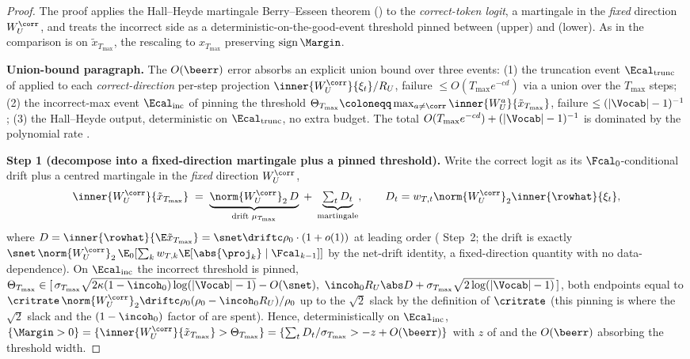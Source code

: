 \begin{proof}
The proof applies the Hall--Heyde martingale Berry--Esseen theorem
() to the \emph{correct-token logit}, a martingale in
the \emph{fixed} direction $W_U^{\corr}$, and treats the incorrect side as a
deterministic-on-the-good-event threshold pinned between
 (upper) and  (lower).
As in  the comparison is on $\tilde x_{T_{\max}}$, the rescaling
to $x_{T_{\max}}$ preserving $\operatorname{sign}\Margin$.

\smallskip\noindent\textbf{Union-bound paragraph.} The $O(\beerr)$ error
absorbs an explicit union bound over three events: (1) the truncation event
$\Ecal_{\mathrm{trunc}}$ of  applied to each
\emph{correct-direction} per-step projection $\inner{W_U^{\corr}}{\xi_t}/R_U$,
failure $\le O(T_{\max}e^{-cd})$ via a union over the $T_{\max}$ steps; (2)
the incorrect-max event $\Ecal_{\mathrm{inc}}$ of
 pinning the threshold
$\Theta_{T_{\max}}\coloneqq\max_{a\neq\corr}\inner{W_U^a}{\tilde x_{T_{\max}}}$,
failure $\le(|\Vocab|-1)^{-1}$; (3) the Hall--Heyde output, deterministic on
$\Ecal_{\mathrm{trunc}}$, no extra budget. The total
$O(T_{\max}e^{-cd})+(|\Vocab|-1)^{-1}$ is dominated by the polynomial rate
.

\smallskip\noindent\textbf{Step 1 (decompose into a fixed-direction
martingale plus a pinned threshold).} Write the correct logit as its
$\Fcal_0$-conditional drift plus a centred martingale in the \emph{fixed}
direction $W_U^{\corr}$,
\begin{align*}
   \inner{W_U^{\corr}}{\tilde x_{T_{\max}}}
   \;=\; \underbrace{\norm{W_U^{\corr}}_2\, D}_{\text{drift }\mu_{T_{\max}}}
       \;+\; \underbrace{\textstyle\sum_{t} D_t}_{\text{martingale}},
   \qquad
   D_t=w_{T,t}\norm{W_U^{\corr}}_2\inner{\rowhat}{\xi_t},
\end{align*}
where $D=\inner{\rowhat}{\E\tilde x_{T_{\max}}}=\snet\driftc\rho_0\cdot(1+o(1))$
at leading order ( Step~2; the drift is exactly
$\snet\,\norm{W_U^{\corr}}_2\,\E_0[\sum_k w_{T,k}\E[\abs{\proj_k}\mid\Fcal_{k-1}]]$
by the net-drift identity, a fixed-direction quantity with no
data-dependence). On $\Ecal_{\mathrm{inc}}$ the incorrect threshold is pinned,
$\Theta_{T_{\max}}\in[\,\sigma_{T_{\max}}\sqrt{2\kappa(1-\incoh_0)\log(|\Vocab|-1)}-O(\snet),\ \incoh_0 R_U\abs D+\sigma_{T_{\max}}\sqrt{2\log(|\Vocab|-1)}\,]$,
both endpoints equal to $\critrate\,\norm{W_U^{\corr}}_2\driftc\rho_0(\rho_0-\incoh_0 R_U)/\rho_0$
up to the $\sqrt2$ slack by the definition  of
$\critrate$ (this pinning is where the $\sqrt2$ slack and the $(1-\incoh_0)$
factor of  are spent). Hence, deterministically on
$\Ecal_{\mathrm{inc}}$,
$\{\Margin>0\}=\{\inner{W_U^{\corr}}{\tilde x_{T_{\max}}}>\Theta_{T_{\max}}\}=\{\sum_t D_t/\sigma_{T_{\max}}>-z+O(\beerr)\}$
with $z$ of  and the $O(\beerr)$ absorbing the threshold width.


\end{proof}
